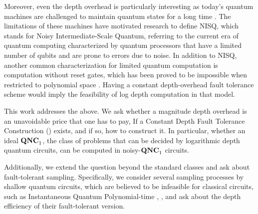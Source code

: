 \documentclass[manuscript,screen,review]{acmart}
\begin{document}
{Moreover, even the depth overhead is particularly interesting as today's quantum machines are challenged to maintain quantum states for a long time \cite{CITE}. The limitations of these machines have motivated research to define NISQ, which stands for Noisy Intermediate-Scale Quantum, referring to the current era of quantum computing characterized by quantum processors that have a limited number of qubits and are prone to errors due to noise. In addition to NISQ, another common characterization for limited quantum computation is computation without reset gates, which has been proved to be impossible when restricted to polynomial space \cite{aharonov1996limitationsnoisyreversiblecomputation}. Having a constant depth-overhead fault tolerance scheme would imply the feasibility of log depth computation in that model.
  
This work addresses the above. We ask whether a magnitude depth overhead is an unavoidable price that one has to pay, If a Constant Depth Fault Tolerance Construction (\CDO{}) exists, and if so, how to construct it. In particular, whether an ideal $\mathbf{QNC}_{1}{}$, the class of problems that can be decided by logarithmic depth quantum circuits, can be computed in noisy-$\mathbf{QNC}_{1}{}$ circuits.

Additionally, we extend the question beyond the standard classes and ask about fault-tolerant sampling. Specifically, we consider several sampling processes by shallow quantum circuits, which are believed to be infeasible for classical circuits, such as Instantaneous Quantum Polynomial-time \cite{Bremner_2017}, \cite{Paletta_2024}, and ask about the depth efficiency of their fault-tolerant version.

%



}
\end{document}
